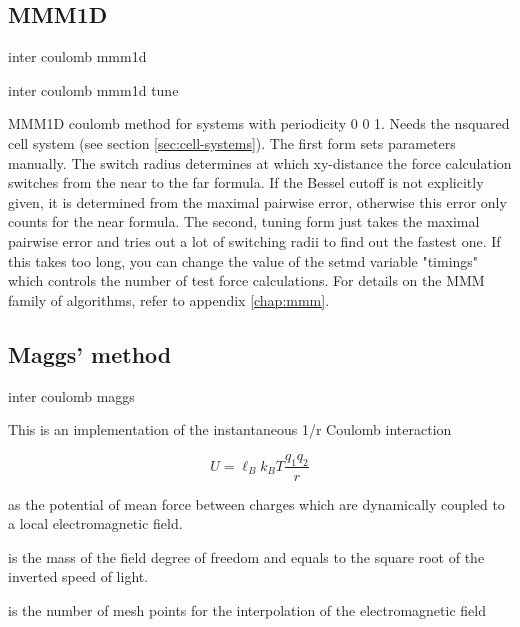 \subsection{MMM1D}

\begin{essyntax}
  inter coulomb mmm1d 
   

  inter coulomb mmm1d tune 
\end{essyntax}
MMM1D coulomb method for systems with periodicity 0 0 1. Needs the
nsquared cell system (see section \vref{sec:cell-systems}). The first
form sets parameters manually. The switch radius determines at which
xy-distance the force calculation switches from the near to the far
formula. If the Bessel cutoff is not explicitly given, it is
determined from the maximal pairwise error, otherwise this error only
counts for the near formula. The second, tuning form just takes the
maximal pairwise error and tries out a lot of switching radii to find
out the fastest one. If this takes too long, you can change the value
of the setmd variable "timings" which controls the number of test
force calculations. For details on the MMM family of algorithms,
refer to appendix \vref{chap:mmm}.

\subsection{Maggs' method}

\begin{essyntax}
  inter coulomb
  maggs   
\end{essyntax}

This is an implementation of the instantaneous 1/r Coulomb interaction

\[ U = \ell_B k_B T \frac{q_1 q_2}{r} \]

as the potential of mean force between charges which are dynamically
coupled to a local electromagnetic field.

 is the mass of the field degree of freedom and equals to
the square root of the inverted speed of light.

 is the number of mesh points for the interpolation of the
electromagnetic field

